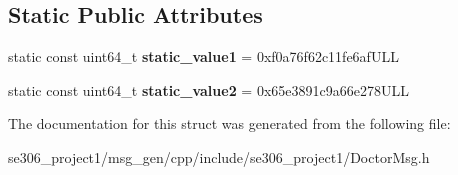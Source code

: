 \subsection*{Static Public Attributes}
\begin{DoxyCompactItemize}
\item 
\hypertarget{structros_1_1message__traits_1_1MD5Sum_3_01_1_1se306__project1_1_1DoctorMsg___3_01ContainerAllocator_01_4_01_4_a82ad2a2715ca706b4df782355a581377}{static const uint64\-\_\-t {\bfseries static\-\_\-value1} = 0xf0a76f62c11fe6af\-U\-L\-L}\label{structros_1_1message__traits_1_1MD5Sum_3_01_1_1se306__project1_1_1DoctorMsg___3_01ContainerAllocator_01_4_01_4_a82ad2a2715ca706b4df782355a581377}

\item 
\hypertarget{structros_1_1message__traits_1_1MD5Sum_3_01_1_1se306__project1_1_1DoctorMsg___3_01ContainerAllocator_01_4_01_4_ac439ab233b91d5252db5d305e83f8231}{static const uint64\-\_\-t {\bfseries static\-\_\-value2} = 0x65e3891c9a66e278\-U\-L\-L}\label{structros_1_1message__traits_1_1MD5Sum_3_01_1_1se306__project1_1_1DoctorMsg___3_01ContainerAllocator_01_4_01_4_ac439ab233b91d5252db5d305e83f8231}

\end{DoxyCompactItemize}


The documentation for this struct was generated from the following file\-:\begin{DoxyCompactItemize}
\item 
se306\-\_\-project1/msg\-\_\-gen/cpp/include/se306\-\_\-project1/Doctor\-Msg.\-h\end{DoxyCompactItemize}
